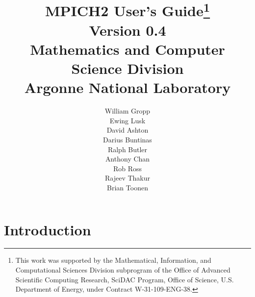 \documentclass[dvipdfm,11pt]{article}
\begin{document}
\title{MPICH2 User's Guide\thanks{This work was supported by the Mathematical,
    Information, and Computational Sciences Division subprogram of the
    Office of Advanced Scientific Computing Research, SciDAC Program,
    Office of Science, U.S. Department of Energy, under Contract
    W-31-109-ENG-38.}\\
Version 0.4\\
Mathematics and Computer Science Division\\
Argonne National Laboratory}

\author{William Gropp\\
Ewing Lusk\\
David Ashton\\
Darius Buntinas\\
Ralph Butler\\
Anthony Chan\\
Rob Ross\\
Rajeev Thakur\\
Brian Toonen}

\maketitle

\cleardoublepage

\tableofcontents
\clearpage

\pagestyle{headings}




\section{Introduction}
\label{sec:introduction}
\end{document}
